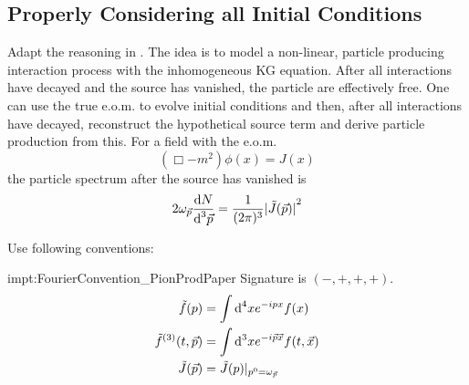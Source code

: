 
\subsection{Properly Considering all Initial Conditions}

Adapt the reasoning in \cite{Amelino-CameliaEtAl_1997}. The idea is to model a non-linear, particle producing interaction process with the inhomogeneous KG equation. After all interactions have decayed and the source has vanished, the particle are effectively free. One can use the true e.o.m. to evolve initial conditions and then, after all interactions have decayed, reconstruct the hypothetical source term and derive particle production from this. For a field with the e.o.m.
\begin{equation}
    (\Box-m^2)\phi(x)=J(x)
\end{equation}
the particle spectrum after the source has vanished is
\begin{equation}
    2\omega_{\vec{p}}\frac{\text{d} N}{\text{d}^3\vec{p}}=\frac{1}{(2\pi)^3}{\vert\tilde{J}(\vec{p})\vert}^2
\end{equation}

Use following conventions:
\begin{impt}{impt:FourierConvention_PionProdPaper}
    Signature is $(-,+,+,+)$.
    \begin{subequations}
        \begin{align}
            \tilde{f}(p)               & =\int\text{d}^4x e^{-{i} px}f(x)                     \\
            \tilde{f}^{(3)}(t,\vec{p}) & =\int\text{d}^3xe^{-{i}\vec{p}{\vec{x}}}f(t,\vec{x}) \\
            \tilde{J}(\vec{p})         & =\tilde{J}(p)\vert_{p^0=\omega_{\vec{p}}}
        \end{align}
    \end{subequations}
\end{impt}

